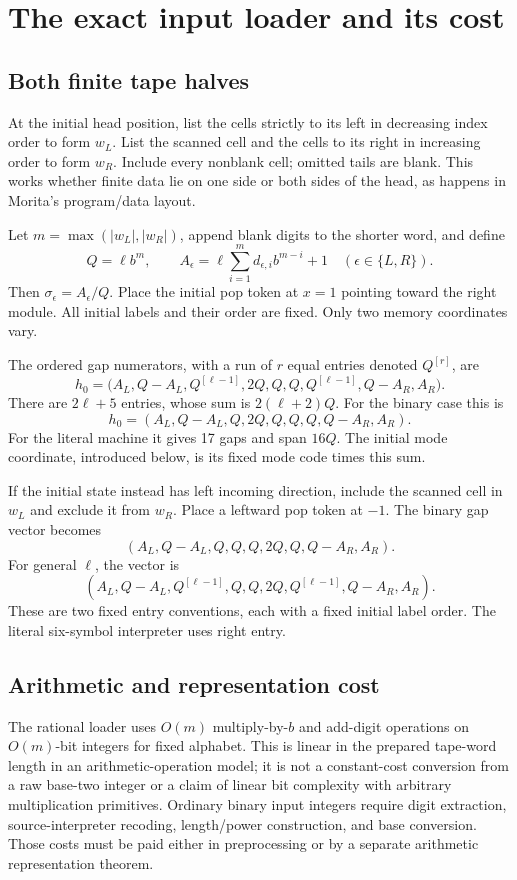 \documentclass[11pt,letterpaper]{article}
\numberwithin{equation}{section}
\theoremstyle{definition}
\theoremstyle{remark}
\newcommand{\sig}{\sigma}\newcommand{\blank}{\mathsf b}
\begin{document}
\section{The exact input loader and its cost}\label{smc:cs:sec:loader}
\subsection{Both finite tape halves}
At the initial head position, list the cells strictly to its left in decreasing index order to form $w_L$. List the scanned cell and the cells to its right in increasing order to form $w_R$. Include every nonblank cell; omitted tails are blank. This works whether finite data lie on one side or both sides of the head, as happens in Morita's program/data layout.

Let $m=\max(|w_L|,|w_R|)$, append blank digits to the shorter word, and define
\[
 Q=\ell b^m,\qquad
 A_\epsilon=\ell\sum_{i=1}^{m}d_{\epsilon,i}b^{m-i}+1
 \quad(\epsilon\in\{L,R\}).
\]
Then $\sig_\epsilon=A_\epsilon/Q$. Place the initial pop token at $x=1$ pointing toward the right module. All initial labels and their order are fixed. Only two memory coordinates vary.

The ordered gap numerators, with a run of $r$ equal entries denoted $Q^{[r]}$, are
\begin{equation}\label{smc:cs:eq:loader-general}
 h_0=\bigl(A_L,Q-A_L,Q^{[\ell-1]},2Q,Q,Q,
            Q^{[\ell-1]},Q-A_R,A_R\bigr).
\end{equation}
There are $2\ell+5$ entries, whose sum is $2(\ell+2)Q$. For the binary case this is
\begin{equation}\label{smc:cs:eq:loader-binary}
 h_0=(A_L,Q-A_L,Q,2Q,Q,Q,Q,Q-A_R,A_R).
\end{equation}
For the literal machine it gives 17 gaps and span $16Q$. The initial mode coordinate, introduced below, is its fixed mode code times this sum.

If the initial state instead has left incoming direction, include the scanned cell in $w_L$ and exclude it from $w_R$. Place a leftward pop token at $-1$. The binary gap vector becomes
\[
 (A_L,Q-A_L,Q,Q,Q,2Q,Q,Q-A_R,A_R).
\]
For general $\ell$, the vector is
\[
 (A_L,Q-A_L,Q^{[\ell-1]},Q,Q,2Q,Q^{[\ell-1]},Q-A_R,A_R).
\]
These are two fixed entry conventions, each with a fixed initial label order. The literal six-symbol interpreter uses right entry.

\subsection{Arithmetic and representation cost}
The rational loader uses $O(m)$ multiply-by-$b$ and add-digit operations on $O(m)$-bit integers for fixed alphabet. This is linear in the prepared tape-word length in an arithmetic-operation model; it is not a constant-cost conversion from a raw base-two integer or a claim of linear bit complexity with arbitrary multiplication primitives. Ordinary binary input integers require digit extraction, source-interpreter recoding, length/power construction, and base conversion. Those costs must be paid either in preprocessing or by a separate arithmetic representation theorem.
\end{document}
